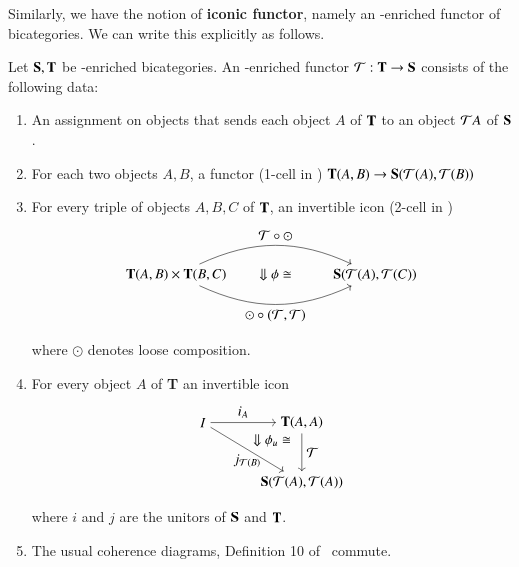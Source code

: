 Similarly, we have the notion of \textbf{iconic functor}, namely an \Icon-enriched functor of bicategories.
We can write this explicitly as follows.

\begin{defn}\label{def:Iconfunc}
Let ${\bf S,T}$ be \Icon-enriched bicategories. An \Icon-enriched functor $\mathcal{T}: {\bf T} \rightarrow {\bf S}$ consists of the following data:
\begin{enumerate}
\item An assignment on objects that sends each object $A$ of ${\bf T}$ to an object $\mathcal{T} A$ of ${\bf S}$.
\item For each two objects $A,B$, a functor (1-cell in \Icon) ${\bf T}(A,B) \rightarrow {\bf S}(\mathcal{T}(A),\mathcal{T}(B))$
\item For every triple of objects $A,B,C$ of ${\bf T}$, an invertible icon (2-cell in \Icon) 
\begin{align} 
\begin{tikzpicture}
\node(1) at (0,0) {${\bf T}(A,B) \times {\bf T}(B,C)$};
\node(2) at (5,0) {${\bf S}(\cT(A),\cT(C))$};
\draw[->] (1) to[in=155, out=25] node[above]{$\cT \circ \odot$} (2); 
\draw[->] (1) to[in=-155, out=-25] node[below]{$\odot \circ (\cT,\cT)$} (2); 
\node at (2.5,0) {$\Downarrow \phi \iso$};
\end{tikzpicture}
\end{align}
where $\odot$ denotes loose composition.
\item For every object $A$ of {\bf T} an invertible icon
\begin{align}
\begin{tikzpicture}[xscale=.5, yscale=.3]
\node(1) at (0,0) {$I$};
\node(2) at (5,0) {${\bf T}(A,A)$};
\node(3) at (5,-5) {${\bf S}(\cT(A),\cT(A))$};
\draw[->] (1) to node[above]{$i_{A}$} (2); 
\draw[->] (1) to node[below]{$j_{\cT(B)}$} (3);
\draw[->] (2) to node[right]{$\cT$} (3); 
\node at (3.5,-1.5) {$\Downarrow \phi_u \iso$};
\end{tikzpicture}
\end{align}
where $i$ and $j$ are the unitors of ${\bf S}$ and ${\bf T}$.
\item The usual coherence diagrams, Definition 10 of~\cite{nick:tricatsbook} commute.
\end{enumerate}
\end{defn}

